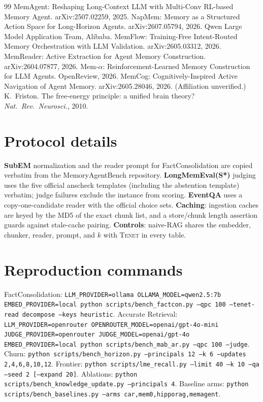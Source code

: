 \documentclass[11pt]{article}
\newcommand{\tenet}{\textsc{Tenet}}
\begin{document}
\begin{thebibliography}{99}
 MemAgent: Reshaping Long-Context LLM with Multi-Conv RL-based Memory
Agent. arXiv:2507.02259, 2025.
 NapMem: Memory as a Structured Action Space for Long-Horizon Agents.
arXiv:2607.05794, 2026. Qwen Large Model Application Team, Alibaba.
 MemFlow: Training-Free Intent-Routed Memory Orchestration with LLM
Validation. arXiv:2605.03312, 2026.
 MemReader: Active Extraction for Agent Memory Construction.
arXiv:2604.07877, 2026.
 Mem-$\alpha$: Reinforcement-Learned Memory Construction for LLM
Agents. OpenReview, 2026.
 MemCog: Cognitively-Inspired Active Navigation of Agent Memory.
arXiv:2605.28046, 2026. (Affiliation unverified.)
 K.~Friston. The free-energy principle: a unified brain theory?
\emph{Nat.\ Rev.\ Neurosci.}, 2010.
\end{thebibliography}

\appendix
\section{Protocol details}
\textbf{SubEM} normalization and the reader prompt for FactConsolidation are copied
verbatim from the MemoryAgentBench repository. \textbf{LongMemEval(S*)} judging uses the
five official anscheck templates (including the abstention template) verbatim; judge
failures exclude the instance from scoring. \textbf{EventQA} uses a copy-one-candidate
reader with the official choice sets. \textbf{Caching}: ingestion caches are keyed by the
MD5 of the exact chunk list, and a store/chunk length assertion guards against stale-cache
pairing. \textbf{Controls}: naive-RAG shares the embedder, chunker, reader, prompt, and
$k$ with \tenet{} in every table.

\section{Reproduction commands}
FactConsolidation: \texttt{LLM\_PROVIDER=ollama OLLAMA\_MODEL=qwen2.5:7b
EMBED\_PROVIDER=local python scripts/bench\_factcon.py --qpc 100 --tenet-read decompose
--keys heuristic}. Accurate Retrieval: \texttt{LLM\_PROVIDER=openrouter
OPENROUTER\_MODEL=openai/gpt-4o-mini JUDGE\_PROVIDER=openrouter JUDGE\_MODEL=openai/gpt-4o
EMBED\_PROVIDER=local python scripts/bench\_mab\_ar.py --qpc 100 --judge}. Churn:
\texttt{python scripts/bench\_horizon.py --principals 12 --k 6 --updates 2,4,6,8,10,12}.
Frontier: \texttt{python scripts/lme\_recall.py --limit 40 --k 10 --qa --seed 2
[--expand 20]}. Ablations: \texttt{python scripts/bench\_knowledge\_update.py
--principals 4}. Baseline arms: \texttt{python scripts/bench\_baselines.py --arms
car,mem0,hipporag,memagent}.
\end{document}

